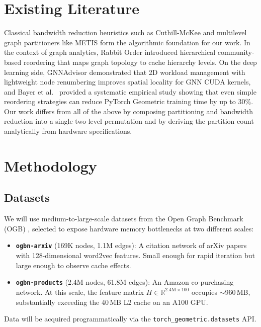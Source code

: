\documentclass[sigconf,review]{acmart}
\begin{document}
\section{Existing Literature}

Classical bandwidth reduction heuristics such as Cuthill-McKee \cite{cuthill1969bandwidth} and multilevel graph partitioners like METIS \cite{karypis1998metis} form the algorithmic foundation for our work. In the context of graph analytics, Rabbit Order \cite{arai2016rabbit} introduced hierarchical community-based reordering that maps graph topology to cache hierarchy levels. On the deep learning side, GNNAdvisor \cite{wang2021gnnadvisor} demonstrated that 2D workload management with lightweight node renumbering improves spatial locality for GNN CUDA kernels, and Bayer et al.\ \cite{bayer2024reordering} provided a systematic empirical study showing that even simple reordering strategies can reduce PyTorch Geometric training time by up to 30\%. Our work differs from all of the above by composing partitioning and bandwidth reduction into a single two-level permutation and by deriving the partition count analytically from hardware specifications.

\section{Methodology}

\subsection{Datasets}
We will use medium-to-large-scale datasets from the Open Graph Benchmark (OGB) \cite{hu2020ogb}, selected to expose hardware memory bottlenecks at two different scales:

\begin{itemize}
    \item \textbf{\texttt{ogbn-arxiv}} (169K nodes, 1.1M edges): A citation network of arXiv papers with 128-dimensional word2vec features. Small enough for rapid iteration but large enough to observe cache effects.
    \item \textbf{\texttt{ogbn-products}} (2.4M nodes, 61.8M edges): An Amazon co-purchasing network. At this scale, the feature matrix $H \in \mathbb{R}^{2.4\text{M}\times 100}$ occupies $\sim$960\,MB, substantially exceeding the 40\,MB L2 cache on an A100 GPU.
\end{itemize}
Data will be acquired programmatically via the \texttt{torch\_geometric.datasets} API.
\end{document}
